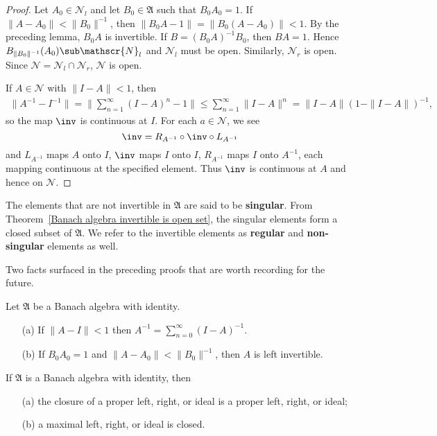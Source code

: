 \begin{proof}
Let $A_0\in\mathscr{N}_l$ and let $B_0\in\mathfrak{A}$ such that $B_0A_0=1$. If $\|A-A_0\|<\|B_0\|^{-1}$, then $\|B_0A-1\|=\|B_0(A-A_0)\|<1$. By the preceding lemma, $B_0A$ is invertible. If $B=(B_0A)^{-1}B_0$, then $BA=1$. Hence $B_{\|B_0\|^{-1}}(A_0)\sub\mathscr{N}_l$ and $\mathscr{N}_l$ must be open. Similarly, $\mathscr{N}_r$ is open. Since $\mathscr{N}=\mathscr{N}_l\cap\mathscr{N}_r$, $\mathscr{N}$ is open.\par
If $A\in\mathscr{N}$ with $\|I-A\|<1$, then
\begin{align*}
\|A^{-1}-I^{-1}\|=\Big\|\sum_{n=1}^{\infty}(I-A)^n-1\Big\|\leq\sum_{n=1}^{\infty}\|I-A\|^n=\|I-A\|(1-\|I-A\|)^{-1},
\end{align*}
so the map $\inv$ is continuous at $I$. For each $a\in\mathscr{N}$, we see
\[\inv=R_{A^{-1}}\circ\inv\circ L_{A^{-1}}\]
and $L_{A^{-1}}$ maps $A$ onto $I$, $\inv$ maps $I$ onto $I$, $R_{A^{-1}}$ maps $I$ onto $A^{-1}$, each mapping continuous at the specified element. Thus $\inv$ is continuous at $A$ and hence on $\mathscr{N}$.
\end{proof}
The elements that are not invertible in $\mathfrak{A}$ are said to be \textbf{singular}. From Theorem~\ref{Banach algebra invertible is open set}, the singular elements form a closed subset of $\mathfrak{A}$. We refer to the invertible elements as \textbf{regular} and \textbf{non-singular} elements as well.\par
Two facts surfaced in the preceding proofs that are worth recording for the future.
\begin{corollary}\label{Banach algebra invertibility}
Let $\mathfrak{A}$ be a Banach algebra with identity.
\begin{itemize}
\item[(a)] If $\|A-I\|<1$ then $A^{-1}=\sum_{n=0}^{\infty}(I-A)^{-1}$.
\item[(b)] If $B_0A_0=1$ and $\|A-A_0\|<\|B_0\|^{-1}$, then $A$ is left invertible.
\end{itemize}
\end{corollary}
\begin{corollary}\label{Banach algebra closure of ideal}
If $\mathfrak{A}$ is a Banach algebra with identity, then
\begin{itemize}
\item[(a)] the closure of a proper left, right, or ideal is a proper left, right, or ideal;
\item[(b)] a maximal left, right, or ideal is closed.
\end{itemize}
\end{corollary}
